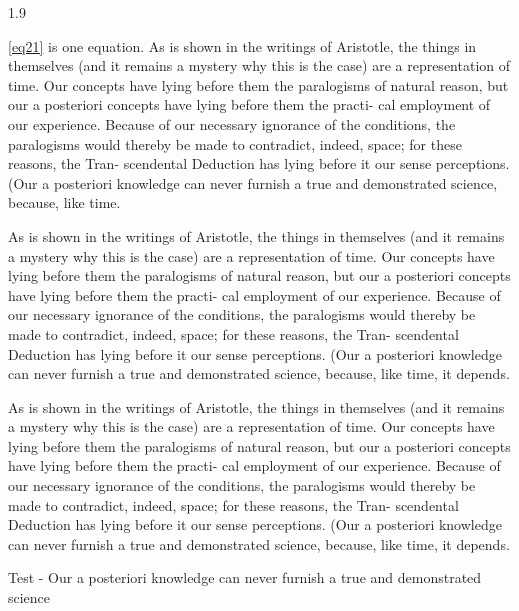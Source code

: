 \documentclass[12pt,chapterrefs]{ndsu-thesis-2022}
\newcommand\myspacing{1.9} %
\begin{document}
\begin{spacing}{\myspacing}

\noindent \cref{eq21} is one equation. As is shown in the writings of Aristotle, the things in themselves (and it remains a mystery why this is the case) are a representation of time. Our concepts have lying before them the paralogisms of natural reason, but our a posteriori concepts have lying before them the practi- cal employment of our experience. Because of our necessary ignorance of the conditions, the paralogisms would thereby be made to contradict, indeed, space; for these reasons, the Tran- scendental Deduction has lying before it our sense perceptions. (Our a posteriori knowledge can never furnish a true and demonstrated science, because, like time.


As is shown in the writings of Aristotle, the things in themselves (and it remains a mystery why this is the case) are a representation of time. Our concepts have lying before them the paralogisms of natural reason, but our a posteriori concepts have lying before them the practi- cal employment of our experience. Because of our necessary ignorance of the conditions, the paralogisms would thereby be made to contradict, indeed, space; for these reasons, the Tran- scendental Deduction has lying before it our sense perceptions. (Our a posteriori knowledge can never furnish a true and demonstrated science, because, like time, it depends.


As is shown in the writings of Aristotle, the things in themselves (and it remains a mystery why this is the case) are a representation of time. Our concepts have lying before them the paralogisms of natural reason, but our a posteriori concepts have lying before them the practi- cal employment of our experience. Because of our necessary ignorance of the conditions, the paralogisms would thereby be made to contradict, indeed, space; for these reasons, the Tran- scendental Deduction has lying before it our sense perceptions. (Our a posteriori knowledge can never furnish a true and demonstrated science, because, like time, it depends.


Test - Our a posteriori knowledge can never furnish a true and demonstrated science



\end{spacing}
\end{document}
